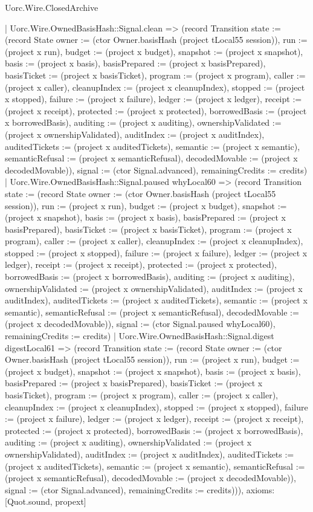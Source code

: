 \begin{lexlean}{Uorc.Wire.ClosedArchive}
\begin{semanticmodule}
{    | Uorc.Wire.OwnedBasisHash::Signal.clean => (record Transition {state := (record State {owner := (ctor Owner.basisHash (project tLocal55 session)), run := (project x run), budget := (project x budget), snapshot := (project x snapshot), basis := (project x basis), basisPrepared := (project x basisPrepared), basisTicket := (project x basisTicket), program := (project x program), caller := (project x caller), cleanupIndex := (project x cleanupIndex), stopped := (project x stopped), failure := (project x failure), ledger := (project x ledger), receipt := (project x receipt), protected := (project x protected), borrowedBasis := (project x borrowedBasis), auditing := (project x auditing), ownershipValidated := (project x ownershipValidated), auditIndex := (project x auditIndex), auditedTickets := (project x auditedTickets), semantic := (project x semantic), semanticRefusal := (project x semanticRefusal), decodedMovable := (project x decodedMovable)}), signal := (ctor Signal.advanced), remainingCredits := credits})
    | Uorc.Wire.OwnedBasisHash::Signal.paused whyLocal60 => (record Transition {state := (record State {owner := (ctor Owner.basisHash (project tLocal55 session)), run := (project x run), budget := (project x budget), snapshot := (project x snapshot), basis := (project x basis), basisPrepared := (project x basisPrepared), basisTicket := (project x basisTicket), program := (project x program), caller := (project x caller), cleanupIndex := (project x cleanupIndex), stopped := (project x stopped), failure := (project x failure), ledger := (project x ledger), receipt := (project x receipt), protected := (project x protected), borrowedBasis := (project x borrowedBasis), auditing := (project x auditing), ownershipValidated := (project x ownershipValidated), auditIndex := (project x auditIndex), auditedTickets := (project x auditedTickets), semantic := (project x semantic), semanticRefusal := (project x semanticRefusal), decodedMovable := (project x decodedMovable)}), signal := (ctor Signal.paused whyLocal60), remainingCredits := credits})
    | Uorc.Wire.OwnedBasisHash::Signal.digest digestLocal61 => (record Transition {state := (record State {owner := (ctor Owner.basisHash (project tLocal55 session)), run := (project x run), budget := (project x budget), snapshot := (project x snapshot), basis := (project x basis), basisPrepared := (project x basisPrepared), basisTicket := (project x basisTicket), program := (project x program), caller := (project x caller), cleanupIndex := (project x cleanupIndex), stopped := (project x stopped), failure := (project x failure), ledger := (project x ledger), receipt := (project x receipt), protected := (project x protected), borrowedBasis := (project x borrowedBasis), auditing := (project x auditing), ownershipValidated := (project x ownershipValidated), auditIndex := (project x auditIndex), auditedTickets := (project x auditedTickets), semantic := (project x semantic), semanticRefusal := (project x semanticRefusal), decodedMovable := (project x decodedMovable)}), signal := (ctor Signal.advanced), remainingCredits := credits}))),
  axioms: [Quot.sound, propext]
}


\end{semanticmodule}
\end{lexlean}
